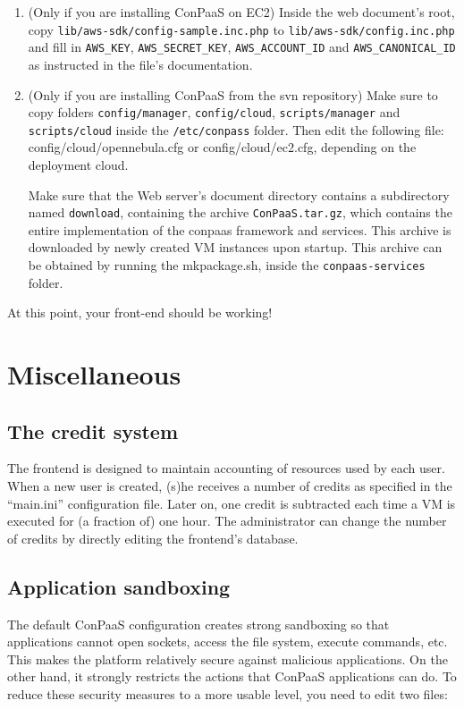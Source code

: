 \documentclass[10pt]{article}
\begin{document}
\begin{enumerate}
\item (Only if you are installing ConPaaS on EC2) 
  Inside the web document's root, copy
  \verb+lib/aws-sdk/config-sample.inc.php+ to
  \verb+lib/aws-sdk/config.inc.php+ and fill in \verb+AWS_KEY+,
  \verb+AWS_SECRET_KEY+, \verb+AWS_ACCOUNT_ID+ and
  \verb+AWS_CANONICAL_ID+ as instructed in the file's documentation.

\item (Only if you are installing ConPaaS from the svn repository)
  Make sure to copy folders \verb+config/manager+, \verb+config/cloud+,
  \verb+scripts/manager+ and \verb+scripts/cloud+ inside the 
  \verb+/etc/conpass+ folder. Then edit the 
  following file: config/cloud/opennebula.cfg or config/cloud/ec2.cfg,
  depending on the deployment cloud.

  Make sure that the Web server's document directory contains a
  subdirectory named \verb+download+, containing the archive
  \verb+ConPaaS.tar.gz+, which contains the entire implementation
  of the conpaas framework and services. This archive is downloaded by newly
  created VM instances upon startup. This archive can be obtained
  by running the mkpackage.sh, inside the \verb+conpaas-services+ folder.

\end{enumerate}

At this point, your front-end should be working!

\section{Miscellaneous}
\subsection{The credit system}

The frontend is designed to maintain accounting of resources used by
each user. When a new user is created, (s)he receives a number of
credits as specified in the ``main.ini'' configuration file. Later on,
one credit is subtracted each time a VM is executed for (a fraction
of) one hour. The administrator can change the number of credits by
directly editing the frontend's database. 

\subsection{Application sandboxing}

The default ConPaaS configuration creates strong sandboxing so that
applications cannot open sockets, access the file system, execute
commands, etc. This makes the platform relatively secure against
malicious applications. On the other hand, it strongly restricts the
actions that ConPaaS applications can do. To reduce these security
measures to a more usable level, you need to edit two files:
\end{document}
